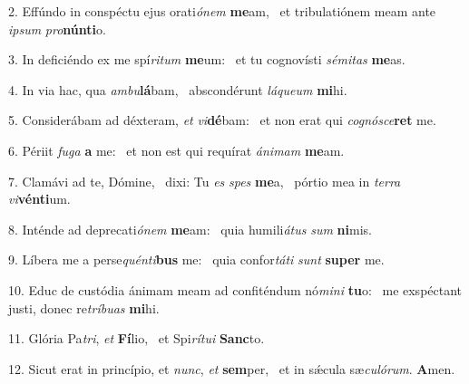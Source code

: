 2. Effúndo in conspéctu ejus orati\textit{ó}\textit{nem} \textbf{me}am, \ast\  et tribulatiónem meam ante \textit{ip}\textit{sum} \textit{pro}\textbf{nún}\textbf{ti}o.\

3. In deficiéndo ex me spí\textit{ri}\textit{tum} \textbf{me}um: \ast\  et tu cognovísti \textit{sé}\textit{mi}\textit{tas} \textbf{me}as.\

4. In via hac, qua \textit{am}\textit{bu}\textbf{lá}bam, \ast\  abscondérunt \textit{lá}\textit{que}\textit{um} \textbf{mi}hi.\

5. Considerábam ad déxteram, \textit{et} \textit{vi}\textbf{dé}bam: \ast\  et non erat qui \textit{co}\textit{gnó}\textit{sce}\textbf{ret} me.\

6. Périit \textit{fu}\textit{ga} \textbf{a} me: \ast\  et non est qui requírat \textit{á}\textit{ni}\textit{mam} \textbf{me}am.\

7. Clamávi ad te, Dómine, \dag\  dixi: Tu \textit{es} \textit{spes} \textbf{me}a, \ast\  pórtio mea in \textit{ter}\textit{ra} \textit{vi}\textbf{vén}\textbf{ti}um.\

8. Inténde ad deprecati\textit{ó}\textit{nem} \textbf{me}am: \ast\  quia humili\textit{á}\textit{tus} \textit{sum} \textbf{ni}mis.\

9. Líbera me a perse\textit{quén}\textit{ti}\textbf{bus} me: \ast\  quia confor\textit{tá}\textit{ti} \textit{sunt} \textbf{su}\textbf{per} me.\

10. Educ de custódia ánimam meam ad confiténdum nó\textit{mi}\textit{ni} \textbf{tu}o: \ast\  me exspéctant justi, donec re\textit{trí}\textit{bu}\textit{as} \textbf{mi}hi.\

11. Glória Pa\textit{tri}, \textit{et} \textbf{Fí}lio, \ast\  et Spi\textit{rí}\textit{tu}\textit{i} \textbf{Sanc}to.\

12. Sicut erat in princípio, et \textit{nunc}, \textit{et} \textbf{sem}per, \ast\  et in sǽcula sæ\textit{cu}\textit{ló}\textit{rum}. \textbf{A}men.\

